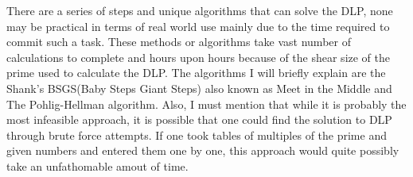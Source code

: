 \documentclass{article}
\begin{document}
\begin{itemize}
    There are a series of steps and unique algorithms that can solve the DLP, none may be practical in terms of real world use mainly due to the time required to 
    commit such a task. These methods or algorithms take vast number of calculations to complete and hours upon hours because of the shear size of the prime used to 
    calculate the DLP. The algorithms I will briefly explain are the Shank's BSGS(Baby Steps Giant Steps) also known as Meet in the Middle and The Pohlig-Hellman 
    algorithm. Also, I must mention that while it is probably the most infeasible approach, it is possible that one could find the solution to DLP through brute force
    attempts. If one took tables of multiples of the prime and given numbers and entered them one by one, this approach would quite possibly take an unfathomable 
    amout of time.  \\
    

\end{itemize}
\end{document}
